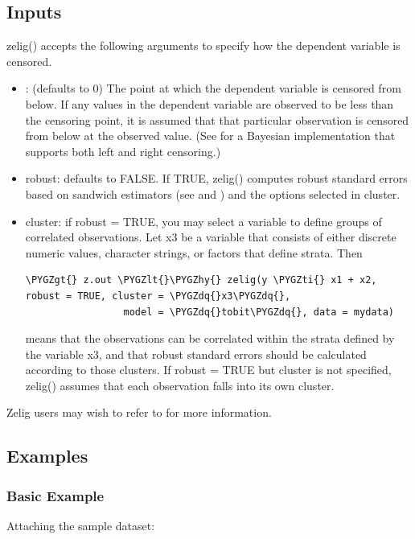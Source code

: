 \documentclass[letterpaper,10pt,english]{sphinxmanual}
\def\PYGZlt{\char`\<}
\def\PYGZgt{\char`\>}
\def\PYGZhy{\char`\-}
\def\PYGZdq{\char`\"}
\def\PYGZti{\char`\~}
\begin{document}
\subsection{Inputs}
\label{vignette:inputs}
zelig() accepts the following arguments to specify how the dependent
variable is censored.
\begin{itemize}
\item {} 
: (defaults to 0) The point at which the dependent variable
is censored from below. If any values in the dependent variable are
observed to be less than the censoring point, it is assumed that that
particular observation is censored from below at the observed value.
(See for a Bayesian implementation that supports both left and right
censoring.)

\item {} 
robust: defaults to FALSE. If TRUE, zelig() computes robust standard
errors based on sandwich estimators (see and ) and the options
selected in cluster.

\item {} 
cluster: if robust = TRUE, you may select a variable to define groups
of correlated observations. Let x3 be a variable that consists of
either discrete numeric values, character strings, or factors that
define strata. Then

\begin{Verbatim}[commandchars=\\\{\}]
\PYGZgt{} z.out \PYGZlt{}\PYGZhy{} zelig(y \PYGZti{} x1 + x2, robust = TRUE, cluster = \PYGZdq{}x3\PYGZdq{},
                 model = \PYGZdq{}tobit\PYGZdq{}, data = mydata)
\end{Verbatim}

means that the observations can be correlated within the strata
defined by the variable x3, and that robust standard errors should be
calculated according to those clusters. If robust = TRUE but cluster
is not specified, zelig() assumes that each observation falls into
its own cluster.

\end{itemize}

Zelig users may wish to refer to  for more information.


\subsection{Examples}
\label{vignette:id58}

\subsubsection{Basic Example}
\label{vignette:id59}
Attaching the sample dataset:
\end{document}
